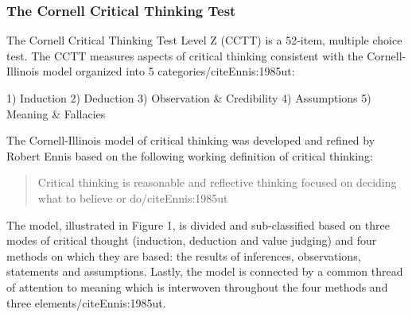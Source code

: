 \subsubsection{The Cornell Critical Thinking Test}

The Cornell Critical Thinking Test Level Z (CCTT) is a 52-item, multiple choice test. The CCTT measures aspects of critical thinking consistent with the Cornell-Illinois model organized into 5 categories/cite{Ennis:1985ut}:

1)	Induction
2)	Deduction
3)	Observation & Credibility
4)	Assumptions
5)	Meaning & Fallacies

The Cornell-Illinois model of critical thinking was developed and refined by Robert Ennis based on the following working definition of critical thinking:

\begin{quote}Critical thinking is reasonable and reflective thinking focused on deciding what to believe or do/cite{Ennis:1985ut}\end{quote}

The model, illustrated in Figure 1, is divided and sub-classified based on three modes of critical thought (induction, deduction and value judging) and four methods on which they are based: the results of inferences, observations, statements and assumptions. Lastly, the model is connected by a common thread of attention to meaning which is interwoven throughout the four methods and three elements/cite{Ennis:1985ut}. 

